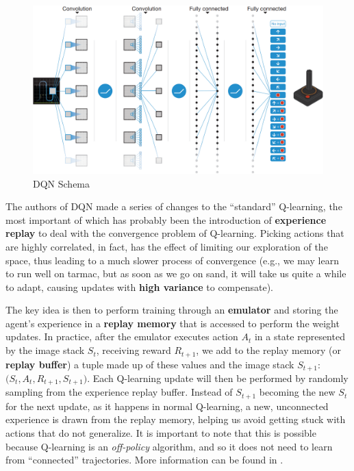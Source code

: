 \begin{figure}
    \centering
    \includegraphics[scale=0.4]{Images/Chapter 7/ataridqn.png}
    \caption{DQN Schema}
    \label{fig:ch7-dqnschema}
\end{figure}

The authors of DQN made a series of changes to the ``standard'' Q-learning, the most important of which has probably been the introduction of \textbf{experience replay} to deal with the convergence problem of Q-learning. Picking actions that are highly correlated, in fact, has the effect of limiting our exploration of the space, thus leading to a much slower process of convergence (e.g., we may learn to run well on tarmac, but as soon as we go on sand, it will take us quite a while to adapt, causing updates with \textbf{high variance} to compensate).

The key idea is then to perform training through an \textbf{emulator} and storing the agent’s experience in a \textbf{replay memory} that is accessed to perform the weight updates. In practice, after the emulator executes action $A_t$ in a state represented by the image stack $S_t$, receiving reward $R_{t+1}$, we add to the replay memory (or \textbf{replay buffer}) a tuple made up of these values and the image stack $S_{t+1}$: $\big(S_t,A_t,R_{t+1},S_{t+1}\big)$. Each Q-learning update will then be performed by randomly sampling from the experience replay buffer. Instead of $S_{t+1}$ becoming the new $S_t$ for the next update, as it happens in normal Q-learning, a new, unconnected experience is drawn from the replay memory, helping us avoid getting stuck with actions that do not generalize. It is important to note that this is possible because Q-learning is an \textit{off-policy} algorithm, and so it does not need to learn from ``connected'' trajectories. More information can be found in \cite{10.1007/BF00992699}.